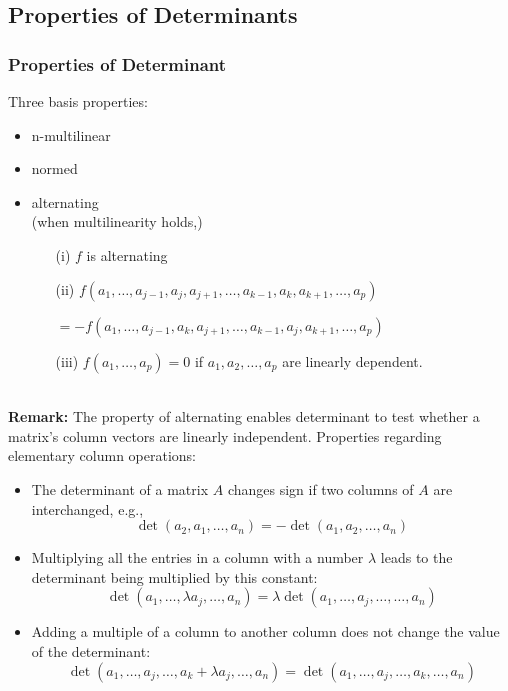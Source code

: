 \documentclass[12pt, t]{beamer}
\newcommand{\myseries}[2]{$#1_1,#1_2,\dots,#1_#2$}
\newcommand{\nullspace}{~\\[15pt]}
\newcommand{\remark}{\textbf{Remark: }}
\begin{document}
\subsection{Properties of Determinants}
\begin{frame}[allowframebreaks]
    \frametitle{Properties of Determinant}
    Three basis properties:
    \begin{itemize}
        \item n-multilinear
        \item normed
        \item alternating\\
              (when multilinearity holds,)
              \begin{itemize}
                  \item[(i)] $f$ is alternating
                  \item[(ii)] $f(a_1,\ldots,a_{j-1},a_j,a_{j+1},\ldots,a_{k-1},a_k,a_{k+1},\ldots,a_p)$\\ \begin{flushright}
                            $=-f(a_1,\ldots,a_{j-1},a_k,a_{j+1},\ldots,a_{k-1},a_j,a_{k+1},\ldots,a_p)$
                        \end{flushright}
                  \item[(iii)] $f(a_1,\ldots,a_p)=0$ if \myseries{a}{p} are linearly dependent.
              \end{itemize}
    \end{itemize}
    \nullspace
    \remark The property of alternating enables determinant to test whether a matrix's column vectors are linearly independent.
    \newpage
    Properties regarding elementary column operations:
    \begin{itemize}
        \small
        \item The determinant of a matrix $A$ changes sign if two columns of $A$ are interchanged, e.g.,
              \[\det(a_2,a_1,\ldots,a_n)=-\det(a_1,a_2,\ldots,a_n)\]
        \item Multiplying all the entries in a column with a number $\lambda$ leads to the determinant being multiplied by this constant:
              \[\det(a_1,\ldots,\lambda a_j,\ldots,a_n)=\lambda\det(a_1,\ldots,a_j,\ldots,\ldots,a_n)\]
        \item Adding a multiple of a column to another column does not change the value of the determinant:
              \[\det(a_1,\ldots,a_j,\ldots,a_k+\lambda a_j,\ldots,a_n)=\det(a_1,\ldots,a_j,\ldots,a_k,\ldots,a_n)\]
    \end{itemize}

\end{frame}
\end{document}
